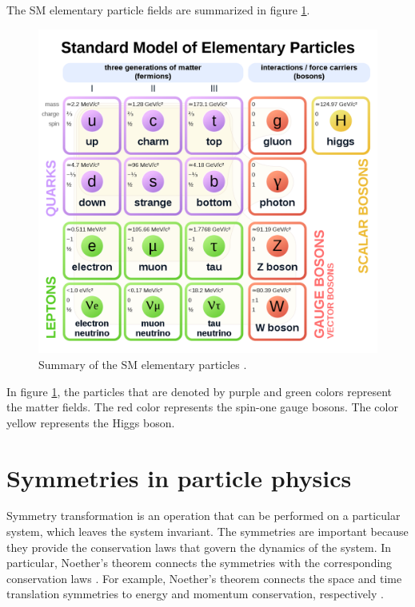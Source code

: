 The SM elementary particle fields are summarized in figure \ref{fig:SM_summary}. 
\begin{figure}[H]
\centering
\includegraphics[width=12cm]{SM_sum.png}
\caption{\label{fig:SM_summary}
Summary of the SM elementary particles \cite{SM_summary} .}
\end{figure}
In figure \ref{fig:SM_summary}, the particles that are denoted by purple and green colors represent the matter fields. The red color represents the spin-one gauge bosons. The color yellow represents the Higgs boson. \par

\section{Symmetries in particle physics}\label{symmetry}
Symmetry transformation is an operation that can be performed on a particular system, which leaves the system invariant. The symmetries are important because they provide the conservation laws that govern the dynamics of the system. In particular, Noether's theorem connects the symmetries with the corresponding conservation laws \cite{Noether:1918zz}. For example, Noether's theorem connects the space and time translation symmetries to energy and momentum conservation, respectively \cite{Griffiths:2008zz}. \par
